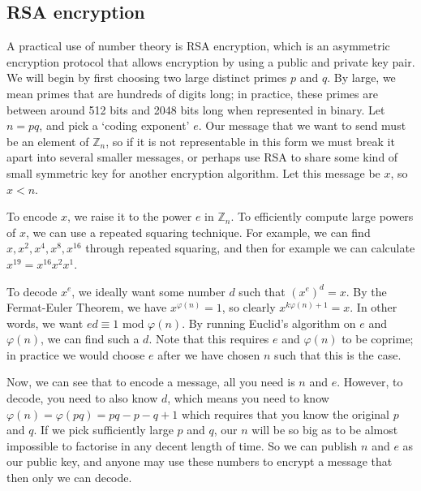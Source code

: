 \subsection{RSA encryption}
A practical use of number theory is RSA encryption, which is an asymmetric encryption protocol that allows encryption by using a public and private key pair.
We will begin by first choosing two large distinct primes \(p\) and \(q\).
By large, we mean primes that are hundreds of digits long; in practice, these primes are between around 512 bits and 2048 bits long when represented in binary.
Let \(n=pq\), and pick a `coding exponent' \(e\).
Our message that we want to send must be an element of \(\mathbb Z_n\), so if it is not representable in this form we must break it apart into several smaller messages, or perhaps use RSA to share some kind of small symmetric key for another encryption algorithm.
Let this message be \(x\), so \(x < n\).

To encode \(x\), we raise it to the power \(e\) in \(\mathbb Z_n\).
To efficiently compute large powers of \(x\), we can use a repeated squaring technique.
For example, we can find \(x, x^2, x^4, x^8, x^{16}\) through repeated squaring, and then for example we can calculate \(x^{19} = x^{16} x^{2} x^{1}\).

To decode \(x^e\), we ideally want some number \(d\) such that \((x^e)^d = x\).
By the Fermat-Euler Theorem, we have \(x^{\varphi(n)} = 1\), so clearly \(x^{k\varphi(n) + 1} = x\).
In other words, we want \(ed \equiv 1 \text{ mod } \varphi(n)\).
By running Euclid's algorithm on \(e\) and \(\varphi(n)\), we can find such a \(d\).
Note that this requires \(e\) and \(\varphi(n)\) to be coprime; in practice we would choose \(e\) after we have chosen \(n\) such that this is the case.

Now, we can see that to encode a message, all you need is \(n\) and \(e\).
However, to decode, you need to also know \(d\), which means you need to know \(\varphi(n) = \varphi(pq) = pq - p - q + 1\) which requires that you know the original \(p\) and \(q\).
If we pick sufficiently large \(p\) and \(q\), our \(n\) will be so big as to be almost impossible to factorise in any decent length of time.
So we can publish \(n\) and \(e\) as our public key, and anyone may use these numbers to encrypt a message that then only we can decode.
